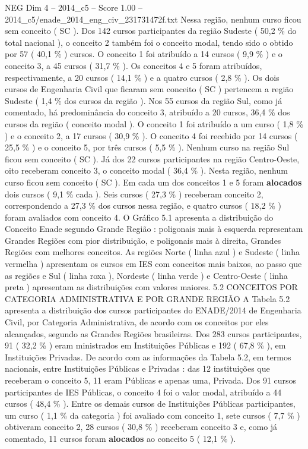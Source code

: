 \begin{textsample}{NEG Dim 4 – 2014\_c5 – Score 1.00 – 2014\_c5/enade\_2014\_eng\_civ\_231731472f.txt}
Nessa região, nenhum curso ficou sem conceito ( SC ).
Dos 142 cursos participantes da região Sudeste ( 50,2 \% do total nacional ), o conceito 2 também foi o conceito modal, tendo sido o obtido por 57 ( 40,1 \% ) cursos.
O conceito 1 foi atribuído a 14 cursos ( 9,9 \% ) e o conceito 3, a 45 cursos ( 31,7 \% ).
Os conceitos 4 e 5 foram atribuídos, respectivamente, a 20 cursos ( 14,1 \% ) e a quatro cursos ( 2,8 \% ).
Os dois cursos de Engenharia Civil que ficaram sem conceito ( SC ) pertencem a região Sudeste ( 1,4 \% dos cursos da região ).
Nos 55 cursos da região Sul, como já comentado, há predominância do conceito 3, atribuído a 20 cursos, 36,4 \% dos cursos da região ( conceito modal ).
O conceito 1 foi atribuído a um curso ( 1,8 \% ) e o conceito 2, a 17 cursos ( 30,9 \% ).
O conceito 4 foi recebido por 14 cursos ( 25,5 \% ) e o conceito 5, por três cursos ( 5,5 \% ).
Nenhum curso na região Sul ficou sem conceito ( SC ).
Já dos 22 cursos participantes na região Centro-Oeste, oito receberam conceito 3, o conceito modal ( 36,4 \% ).
Nesta região, nenhum curso ficou sem conceito ( SC ).
Em cada um dos conceitos 1 e 5 foram \textbf{alocados} dois cursos ( 9,1 \% cada ).
Seis cursos ( 27,3 \% ) receberam conceito 2, correspondendo a 27,3 \% dos cursos nessa região, e quatro cursos ( 18,2 \% ) foram avaliados com conceito 4.
O Gráfico 5.1 apresenta a distribuição do Conceito Enade segundo Grande Região : poligonais mais à esquerda representam Grandes Regiões com pior distribuição, e poligonais mais à direita, Grandes Regiões com melhores conceitos.
As regiões Norte ( linha azul ) e Sudeste ( linha vermelha ) apresentam os cursos em IES com conceitos mais baixos, ao passo que as regiões e Sul ( linha roxa ), Nordeste ( linha verde ) e Centro-Oeste ( linha preta ) apresentam as distribuições com valores maiores. 5.2 CONCEITOS POR CATEGORIA ADMINISTRATIVA E POR GRANDE REGIÃO A Tabela 5.2 apresenta a distribuição dos cursos participantes do ENADE/2014 de Engenharia Civil, por Categoria Administrativa, de acordo com os conceitos por eles alcançados, segundo as Grandes Regiões brasileiras.
Dos 283 cursos participantes, 91 ( 32,2 \% ) eram ministrados em Instituições Públicas e 192 ( 67,8 \% ), em Instituições Privadas.
De acordo com as informações da Tabela 5.2, em termos nacionais, entre Instituições Públicas e Privadas : das 12 instituições que receberam o conceito 5, 11 eram Públicas e apenas uma, Privada.
Dos 91 cursos participantes de IES Públicas, o conceito 4 foi o valor modal, atribuído a 44 cursos ( 48,4 \% ).
Entre os demais cursos de Instituições Públicas participantes, um curso ( 1,1 \% da categoria ) foi avaliado com conceito 1, sete cursos ( 7,7 \% ) obtiveram conceito 2, 28 cursos ( 30,8 \% ) receberam conceito 3 e, como já comentado, 11 cursos foram \textbf{alocados} ao conceito 5 ( 12,1 \% ).

\end{textsample}
